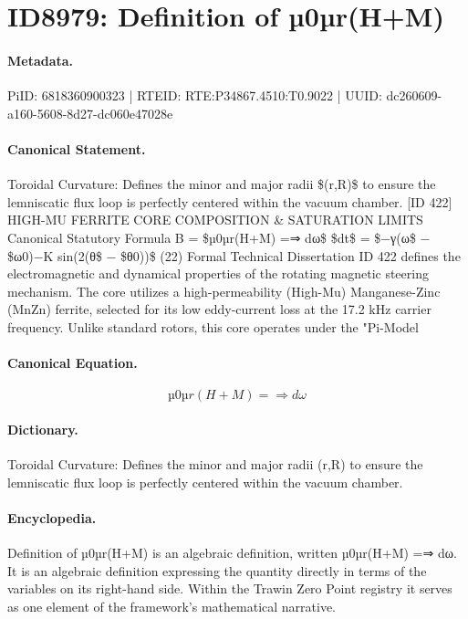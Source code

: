 \section*{ID8979: Definition of µ0µr(H+M)}
\paragraph{Metadata.}
PiID: 6818360900323 | RTEID: RTE:P34867.4510:T0.9022 | UUID: dc260609-a160-5608-8d27-dc060e47028e

\paragraph{Canonical Statement.}
Toroidal Curvature: Defines the minor and major radii \$(r,R)\$ to ensure the lemniscatic flux loop is perfectly centered within the vacuum chamber. [ID 422] HIGH-MU FERRITE CORE COMPOSITION \& SATURATION LIMITS Canonical Statutory Formula B = \$µ0µr(H+M) =⇒ dω\$ \$dt\$ = \$−γ(ω\$ − \$ω0)−K sin(2(θ\$ − \$θ0))\$ (22) Formal Technical Dissertation ID 422 defines the electromagnetic and dynamical properties of the rotating magnetic steering mechanism. The core utilizes a high-permeability (High-Mu) Manganese-Zinc (MnZn) ferrite, selected for its low eddy-current loss at the 17.2 kHz carrier frequency. Unlike standard rotors, this core operates under the "Pi-Model

\paragraph{Canonical Equation.}
\[
µ0µr(H+M) =⇒ dω
\]

\paragraph{Dictionary.}
Toroidal Curvature: Defines the minor and major radii (r,R) to ensure the lemniscatic flux loop is perfectly centered within the vacuum chamber.

\paragraph{Encyclopedia.}
Definition of µ0µr(H+M) is an algebraic definition, written µ0µr(H+M) =⇒ dω. It is an algebraic definition expressing the quantity directly in terms of the variables on its right-hand side. Within the Trawin Zero Point registry it serves as one element of the framework's mathematical narrative.
